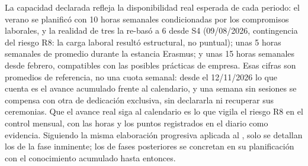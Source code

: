 La capacidad declarada refleja la disponibilidad real esperada de cada periodo: el verano se planificó con 10 horas semanales condicionadas por los compromisos laborales, y la realidad de tres  la re-basó a 6 desde S4 (09/08/2026, contingencia del riesgo R8: la carga laboral resultó estructural, no puntual); unas 5 horas semanales de promedio durante la estancia Erasmus; y unas 15 horas semanales desde febrero, compatibles con las posibles prácticas de empresa.
Esas cifras son promedios de referencia, no una cuota semanal: desde el 12/11/2026 lo que cuenta es el avance acumulado frente al calendario, y una semana sin sesiones se compensa con otra de dedicación exclusiva, sin declararla ni recuperar sus ceremonias.
Que el avance real siga al calendario es lo que vigila el riesgo R8 en el control mensual, con las horas y los puntos registrados en el diario como evidencia.
Siguiendo la misma elaboración progresiva aplicada al , solo se detallan los  de la fase inminente; los de fases posteriores se concretan en su planificación con el conocimiento acumulado hasta entonces.

